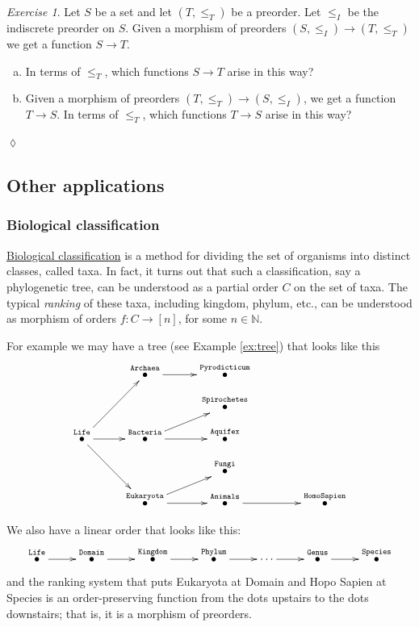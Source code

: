 \documentclass{book}
\def\NN{{\mathbb N}}
\def\to{\rightarrow}
\def\taking{\colon}
\newcommand{\LTO}[1]{\stackrel{\tt{#1}}{\bullet}}
\theoremstyle{remark}
\newtheorem{exc}[subsubsection]{Exercise}
\newenvironment{exercise}{\begin{exc}}{\hspace*{\fill}$\lozenge$\end{exc}}
\theoremstyle{definition}
\def\sexc{\begin{enumerate}[a.)]\setlength{\itemsep}{.1cm}\setlength{\parskip}{.1cm}\item}
\def\next{\item}
\def\endsexc{\end{enumerate}}
\begin{document}
\begin{exercise}
Let $S$ be a set and let $(T,\leq_T)$ be a preorder. Let $\leq_I$ be the indiscrete preorder on $S$. Given a morphism of preorders $(S,\leq_I)\to (T,\leq_T)$ we get a function $S\to T$. 
\sexc In terms of $\leq_T$, which functions $S\to T$ arise in this way? 
\next Given a morphism of preorders $(T,\leq_T)\to(S,\leq_I)$, we get a function $T\to S$. In terms of $\leq_T$, which functions $T\to S$ arise in this way?
\endsexc
\end{exercise}


\subsection{Other applications}


\subsubsection{Biological classification}

\href{http://en.wikipedia.org/wiki/Biological_classification}{\text Biological classification} is a method for dividing the set of organisms into distinct classes, called taxa. In fact, it turns out that such a classification, say a phylogenetic tree, can be understood as a partial order $C$ on the set of taxa. The typical {\em ranking} of these taxa, including kingdom, phylum, etc., can be understood as morphism of orders $f\taking C\to [n]$, for some $n\in\NN$. 

For example we may have a tree (see Example \ref{ex:tree}) that looks like this 
$$
\xymatrix@=10pt{
&&\LTO{Archaea}\ar[rr]&&\LTO{Pyrodicticum}\\
&&&&\LTO{Spirochetes}\\
\LTO{Life}\ar[rr]\ar[ddrr]\ar[uurr]&&\LTO{Bacteria}\ar[rr]\ar[rru]&&\LTO{Aquifex}\\
&&&&\LTO{Fungi}\\
&&\LTO{Eukaryota}\ar[rr]\ar[urr]&&\LTO{Animals}\ar[rrr]&&&\LTO{Homo Sapien}}
$$

We also have a linear order that looks like this:
$$
\xymatrix{\LTO{Life}\ar[r]&\LTO{Domain}\ar[r]&\LTO{Kingdom}\ar[r]&\LTO{Phylum}\ar[r]&\cdots\ar[r]&\LTO{Genus}\ar[r]&\LTO{Species}}
$$
and the ranking system that puts Eukaryota at Domain and Hopo Sapien at Species is an order-preserving function from the dots upstairs to the dots downstairs; that is, it is a morphism of preorders.
\end{document}
